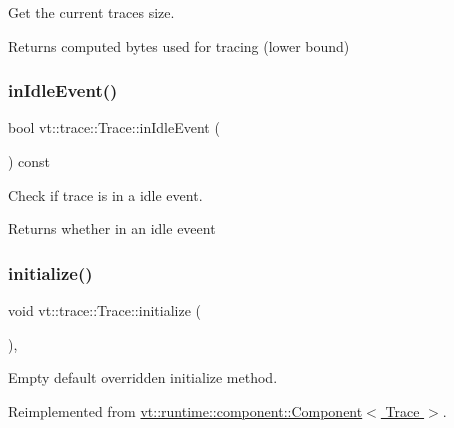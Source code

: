 Get the current traces size. 

\begin{DoxyReturn}{Returns}
computed bytes used for tracing (lower bound) 
\end{DoxyReturn}
\mbox{\label{structvt_1_1trace_1_1_trace_a1e7429d95dbddd9f235a02800d158d36}} 
\subsubsection{\texorpdfstring{in\+Idle\+Event()}{inIdleEvent()}}
{\footnotesize\ttfamily bool vt\+::trace\+::\+Trace\+::in\+Idle\+Event (\begin{DoxyParamCaption}{ }\end{DoxyParamCaption}) const}



Check if trace is in a idle event. 

\begin{DoxyReturn}{Returns}
whether in an idle eveent 
\end{DoxyReturn}
\mbox{\label{structvt_1_1trace_1_1_trace_a24019edd964c0a307008f8d6a0f1f825}} 
\subsubsection{\texorpdfstring{initialize()}{initialize()}}
{\footnotesize\ttfamily void vt\+::trace\+::\+Trace\+::initialize (\begin{DoxyParamCaption}{ }\end{DoxyParamCaption})\hspace{0.3cm}{\ttfamily [override]}, {\ttfamily [virtual]}}



Empty default overridden initialize method. 



Reimplemented from \hyperlink{structvt_1_1runtime_1_1component_1_1_component_a7f07384d294e59796add9ce6be2d6410}{vt\+::runtime\+::component\+::\+Component$<$ Trace $>$}.

\mbox{\label{structvt_1_1trace_1_1_trace_a6d72cba8cfa150f7c97e99b9d65a1cf7}} 
